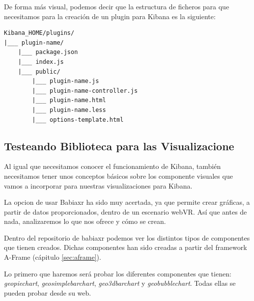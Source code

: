 \documentclass[a4paper, 12pt]{book}
\begin{document}
De forma más visual, podemos decir que la estructura de ficheros para que necesitamos para la creación de un plugin para Kibana es la siguiente:

\begin{lstlisting}[frame=single]
Kibana_HOME/plugins/
|___ plugin-name/
    |___ package.json
    |___ index.js
    |___ public/
        |___ plugin-name.js
        |___ plugin-name-controller.js
        |___ plugin-name.html
        |___ plugin-name.less
        |___ options-template.html
\end{lstlisting}


\subsection{Testeando Biblioteca para las Visualizacione}

Al igual que necesitamos conocer el funcionamiento de Kibana, también necesitamos tener unos conceptos básicos sobre los componente visuales que vamos a incorporar para nuestras visualizaciones para Kibana.

La opcion de usar Babiaxr ha sido muy acertada, ya que permite crear gráficas, a partir de datos proporcionados, dentro de un escenario webVR. Así que antes de nada, analizaremos lo que nos ofrece y cómo se crean.

Dentro del repositorio de babiaxr podemos ver los distintos tipos de componentes que tienen creados. Dichas componentes han sido creadas a partir del framework A-Frame (cápitulo \ref{sec:aframe}).

Lo primero que haremos será probar los diferentes componentes que tienen: \textit{geopiechart}, \textit{geosimplebarchart}, \textit{geo3dbarchart} y \textit{geobubblechart}. Todas ellas se pueden probar desde su web.
\end{document}
